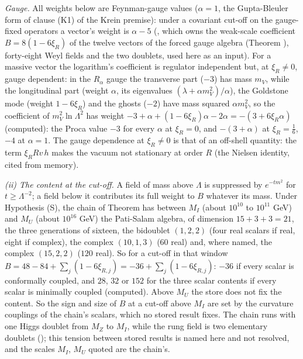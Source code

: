 \emph{Gauge.} All weights below are Feynman-gauge values ($\alpha = 1$, the Gupta-Bleuler form of clause (K1) of the Krein premise): under a covariant cut-off on the gauge-fixed operators a vector's weight is $\alpha - 5$ (, which owns the weak-scale coefficient $B = 8(1 - 6\xi_{R})$ of the twelve vectors of the forced gauge algebra (Theorem ), forty-eight Weyl fields and the two doublets, used here as an input). For a massive vector the logarithm's coefficient is regulator independent but, at $\xi_{R} \neq 0$, gauge dependent: in the $R_{\alpha}$ gauge the transverse part ($-3$) has mass $m_{V}$, while the longitudinal part (weight $\alpha$, its eigenvalues $(\lambda + \alpha m_{V}^{2})/\alpha$), the Goldstone mode (weight $1 - 6\xi_{R}$) and the ghosts ($-2$) have mass squared $\alpha m_{V}^{2}$, so the coefficient of $m_{V}^{2}\ln\Lambda^{2}$ has weight $-3 + \alpha + (1 - 6\xi_{R})\alpha - 2\alpha = -(3 + 6\xi_{R}\alpha)$ (computed): the Proca value $-3$ for every $\alpha$ at $\xi_{R} = 0$, and $-(3 + \alpha)$ at $\xi_{R} = \tfrac16$, $-4$ at $\alpha = 1$. The gauge dependence at $\xi_{R} \neq 0$ is that of an off-shell quantity: the term $\xi_{R}Rv\,h$ makes the vacuum not stationary at order $R$ (the Nielsen identity, cited from memory).

\emph{(ii) The content at the cut-off.} A field of mass above $\Lambda$ is suppressed by $e^{-tm^{2}}$ for $t \ge \Lambda^{-2}$; a field below it contributes its full weight to $B$ whatever its mass. Under Hypothesis (S), the chain of Theorem  has between $M_{I}$ (about $10^{10}$ to $10^{11}$ GeV) and $M_{U}$ (about $10^{16}$ GeV) the Pati-Salam algebra, of dimension $15 + 3 + 3 = 21$, the three generations of sixteen, the bidoublet $(1,2,2)$ (four real scalars if real, eight if complex), the complex $(10,1,3)$ ($60$ real) and, where named, the complex $(15,2,2)$ ($120$ real). So for a cut-off in that window $B = 48 - 84 + \sum_{j}(1 - 6\xi_{R,j}) = -36 + \sum_{j}(1 - 6\xi_{R,j})$: $-36$ if every scalar is conformally coupled, and $28$, $32$ or $152$ for the three scalar contents if every scalar is minimally coupled (computed). Above $M_{U}$ the store does not fix the content. So the sign and size of $B$ at a cut-off above $M_{I}$ are set by the curvature couplings of the chain's scalars, which no stored result fixes. The chain runs with one Higgs doublet from $M_{Z}$ to $M_{I}$, while the rung field is two elementary doublets (); this tension between stored results is named here and not resolved, and the scales $M_{I}$, $M_{U}$ quoted are the chain's.

